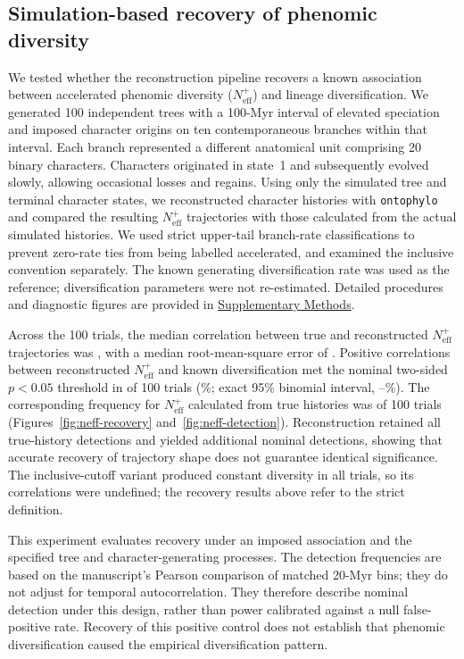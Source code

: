 \subsection*{Simulation-based recovery of phenomic diversity}
\label{sec:neff-main}

We tested whether the reconstruction pipeline recovers a known association
between accelerated phenomic diversity ($N_{\mathrm{eff}}^{+}$) and lineage
diversification. We generated 100 independent trees with a 100-Myr interval
of elevated speciation and imposed character origins on ten contemporaneous
branches within that interval. Each branch represented a different anatomical
unit comprising 20 binary characters. Characters originated in state~1 and
subsequently evolved slowly, allowing occasional losses and regains.
Using only the simulated tree and terminal character states, we reconstructed
character histories with \texttt{ontophylo} and compared the resulting
$N_{\mathrm{eff}}^{+}$ trajectories with those calculated from the actual
simulated histories. We used strict upper-tail branch-rate classifications
to prevent zero-rate ties from being labelled accelerated, and examined the
inclusive convention separately. The known generating diversification rate was used as
the reference; diversification parameters were not re-estimated.
Detailed procedures and diagnostic figures are provided in
\hyperref[sec:neff-supplement]{Supplementary Methods}.

Across the 100 trials, the median correlation between true and reconstructed
$N_{\mathrm{eff}}^{+}$ trajectories was \NeffRecoveryR{}, with a median
root-mean-square error of \NeffRecoveryRMSE{}.
Positive correlations between reconstructed $N_{\mathrm{eff}}^{+}$ and
known diversification met the nominal two-sided $p<0.05$ threshold in
\NeffDetected{} of 100 trials (\NeffDetectedPercent{}\%; exact 95\%
binomial interval, \NeffDetectedLower{}--\NeffDetectedUpper{}\%).
The corresponding frequency for $N_{\mathrm{eff}}^{+}$ calculated from
true histories was \NeffTruthDetected{} of 100 trials
(Figures~\ref{fig:neff-recovery} and~\ref{fig:neff-detection}).
Reconstruction retained all \NeffBothDetected{} true-history detections and yielded \NeffAdditionalDetected{}
additional nominal detections, showing that accurate recovery of trajectory
shape does not guarantee identical significance. The inclusive-cutoff
variant produced constant diversity in all trials, so its correlations
were undefined; the recovery results above refer to the strict definition.

This experiment evaluates recovery under an imposed association and the
specified tree and character-generating processes. The detection frequencies
are based on the manuscript's Pearson comparison of matched 20-Myr bins;
they do not adjust for temporal autocorrelation. They therefore describe
nominal detection under this design, rather than power calibrated against a
null false-positive rate. Recovery of this positive control does not establish
that phenomic diversification caused the empirical diversification pattern.
